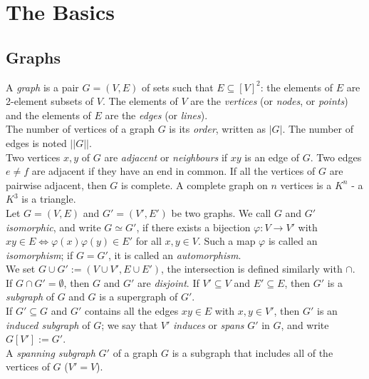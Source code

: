 
\chapter{The Basics}
	\section{Graphs}
		A \textit{graph} is a pair $G = (V, E)$ of sets such that $E \subseteq [V]^2$: the elements of $E$ are 2-element subsets of $V$. The elements of $V$ are the \textit{vertices} (or \textit{nodes}, or \textit{points}) and the elements of $E$ are the \textit{edges} (or \textit{lines}). \\
		
		The number of vertices of a graph $G$ is its \textit{order}, written as $|G|$. The number of edges is noted $||G||$. \\
		
		Two vertices $x, y$ of $G$ are \textit{adjacent} or \textit{neighbours} if $x y$ is an edge of $G$. Two edges $e \neq f$ are adjacent if they have an end in common. If all the vertices of $G$ are pairwise adjacent, then $G$ is complete. A complete graph on $n$ vertices is a $K^n$ - a $K^3$ is a triangle.\\ 
		
		Let $G = (V, E)$ and $G' = (V', E')$ be two graphs. We call $G$ and $G'$ \textit{isomorphic}, and write $G \simeq G'$, if there exists a bijection $\varphi: V \rightarrow V'$ with $xy \in E \iff \varphi(x) \varphi(y) \in E'$ for all $x, y \in V$. Such a map $\varphi$ is called an \textit{isomorphism}; if $G = G'$, it is called an \textit{automorphism}. \\
		
		We set $G \cup G' := (V \cup V', E \cup E')$, the intersection is defined similarly with $\cap$. If $G \cap G' = \emptyset$, then $G$ and $G'$ are \textit{disjoint}. If $V' \subseteq V$ and $E' \subseteq E$, then $G'$ is a \textit{subgraph} of $G$ and $G$ is a supergraph of $G'$.\\
		
		If $G' \subseteq G$ and $G'$ contains all the edges $xy \in E$ with $x, y \in V'$, then $G'$ is an \textit{induced subgraph} of $G$; we say that $V'$ \textit{induces} or \textit{spans} $G'$ in $G$,
                and write $G[V'] := G'$.\\

		A \textit{spanning subgraph} $G'$ of a graph $G$ is a subgraph that includes all of the vertices of $G$ ($V' = V$).

